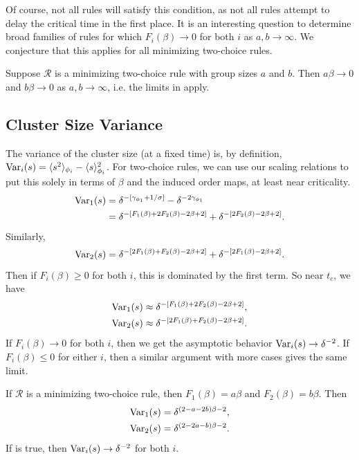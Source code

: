 \documentclass[twoside,10pt]{article}
\begin{document}
Of course, not all rules will satisfy this condition, as not all rules attempt to delay the critical time in the first place. It is an interesting question to determine broad families of rules for which $F_{i}(\beta)\to 0$ for both $i$ as $a,b \to \infty$. We conjecture that this applies for all minimizing two-choice rules.

\begin{conj}
	\label{m-beta-0}
        Suppose $\mathcal{R}$ is a minimizing two-choice rule with group sizes $a$ and $b$. Then $a\beta \to 0$ and $b\beta\to 0$ as $a,b \to \infty$, i.e. the limits in  apply.
\end{conj}

\subsection{Cluster Size Variance}

The variance of the cluster size (at a fixed time) is, by definition, $\operatorname{Var}_i(s) = \langle s^2 \rangle_{\phi_i} - \langle s \rangle^2_{\phi_i}$. For two-choice rules, we can use our scaling relations to put this solely in terms of $\beta$ and the induced order maps, at least near criticality.
\begin{align*}
        \operatorname{Var}_1(s) &= \delta^{-[\gamma_{\phi_1} + 1/\sigma]} - \delta^{-2\gamma_{\phi_1}} \\
                  &= \delta^{-[F_1(\beta)+2F_2(\beta)-2\beta+2]} + \delta^{-[2F_2(\beta)-2\beta+2]}.
\end{align*}
Similarly,
\[
        \operatorname{Var}_2(s) = \delta^{-[2F_1(\beta)+F_2(\beta)-2\beta+2]} + \delta^{-[2F_1(\beta)-2\beta+2]}.
\]
Then if $F_i(\beta) \geq 0$ for both $i$, this is dominated by the first term. So near $t_c$, we have
\begin{align*}
        \operatorname{Var}_1(s) &\approx \delta^{-[F_1(\beta)+2F_2(\beta)-2\beta+2]}, \\
        \operatorname{Var}_2(s) &\approx \delta^{-[2F_1(\beta)+F_2(\beta)-2\beta+2]}.
\end{align*}
If $F_{i}(\beta)\to 0$ for both $i$, then we get the asymptotic behavior $\operatorname{Var}_i(s) \to \delta^{-2}$. If $F_{i}(\beta) \leq 0$ for either $i$, then a similar argument with more cases gives the same limit.

\begin{ex}[]
        If $\mathcal{R}$ is a minimizing two-choice rule, then $F_1(\beta) = a \beta$ and $F_2(\beta)=b \beta$. Then
        \begin{align*}
                \operatorname{Var}_1(s) &= \delta^{(2-a-2b)\beta-2},\\
                \operatorname{Var}_2(s) &= \delta^{(2-2a-b)\beta-2}.
        \end{align*}
        If  is true, then $\operatorname{Var}_i(s) \to \delta^{-2}$ for both $i$.
\end{ex}
\end{document}

